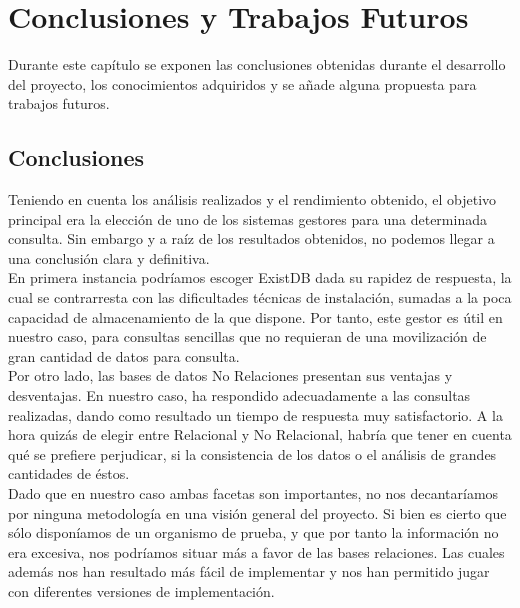 \documentclass[12pt,a4paper]{article}
\begin{document}


\newpage
\mbox{}
\newpage

\section{Conclusiones y Trabajos Futuros} \label{pto9}

Durante este capítulo se exponen las conclusiones obtenidas durante el desarrollo del proyecto, los conocimientos adquiridos y se añade alguna propuesta para trabajos futuros. \\

\subsection{Conclusiones} \label{pto91}

Teniendo en cuenta los análisis realizados y el rendimiento obtenido, el objetivo principal era la elección de uno de los sistemas gestores para una determinada consulta. Sin embargo y a raíz de los resultados obtenidos, no podemos llegar a una conclusión clara y definitiva. \\

En primera instancia podríamos escoger ExistDB dada su rapidez de respuesta, la cual se contrarresta con las dificultades técnicas de instalación, sumadas a la poca capacidad de almacenamiento de la que dispone. Por tanto, este gestor es útil en nuestro caso, para consultas sencillas que no requieran de una movilización de gran cantidad de datos para consulta.\\

Por otro lado, las bases de datos No Relaciones presentan sus ventajas y desventajas. En nuestro caso, ha respondido adecuadamente a las consultas realizadas, dando como resultado un tiempo de respuesta muy satisfactorio. A la hora quizás de elegir entre Relacional y No Relacional, habría que tener en cuenta qué se prefiere perjudicar, si la consistencia de los datos o el análisis de grandes cantidades de éstos.\\

Dado que en nuestro caso ambas facetas son importantes, no nos decantaríamos por ninguna metodología en una visión general del proyecto. Si bien es cierto que sólo disponíamos de un organismo de prueba, y que por tanto la información no era excesiva, nos podríamos situar más a favor de las bases relaciones. Las cuales además nos han resultado más fácil de implementar y nos han permitido jugar con diferentes versiones de implementación.\\
\end{document}
